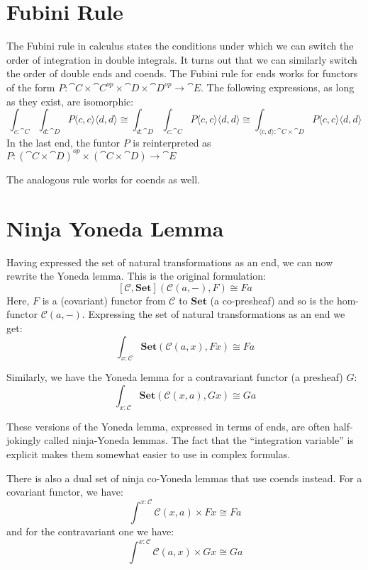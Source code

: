 \documentclass[DaoFP]{subfiles}
\begin{document}
\section{Fubini Rule}

The Fubini rule in calculus states the conditions under which we can switch the order of integration in double integrals. It turns out that we can similarly switch the order of double ends and coends. The Fubini rule for ends works for functors of the form $P \colon \cat C \times \cat C^{op} \times \cat D \times \cat D^{op} \to \cat E$. The following expressions, as long as they exist, are isomorphic:
\[ \int_{c \colon \cat C} \int_{d \colon \cat D} P\langle c, c \rangle \langle d, d \rangle \cong  \int_{d \colon \cat D} \int_{c \colon \cat C} P\langle c, c \rangle \langle d, d \rangle \cong  \int_{\langle c, d \rangle \colon \cat C \times \cat D}  P\langle c, c \rangle \langle d, d \rangle \]
In the last end, the funtor $P$ is reinterpreted as $P \colon (\cat C  \times \cat D)^{op} \times (\cat C \times \cat D)\to \cat E$

The analogous rule works for coends as well.

\section{Ninja Yoneda Lemma}

Having expressed the set of natural transformations as an end, we can now rewrite the Yoneda lemma. This is the original formulation:
\[ [\mathcal{C}, \mathbf{Set}]( \mathcal{C}(a, -), F) \cong F a \]
Here, $F$ is a (covariant) functor from $\mathcal{C}$ to $\mathbf{Set}$ (a co-presheaf) and so is the hom-functor $\mathcal{C}(a, -)$. 
Expressing the set of natural transformations as an end we get:
\[ \int_{x \colon \mathcal{C}} \mathbf{Set} (\mathcal{C}(a, x), F x) \cong F a \]

Similarly, we have the Yoneda lemma for a contravariant functor (a presheaf) $G$:
\[ \int_{x \colon \mathcal{C}} \mathbf{Set} (\mathcal{C}(x, a), G x) \cong G a \]

These versions of the Yoneda lemma, expressed in terms of ends, are often half-jokingly called ninja-Yoneda lemmas. The fact that the ``integration variable'' is explicit makes them somewhat easier to use in complex formulas.

There is also a dual set of ninja co-Yoneda lemmas that use coends instead. For a covariant functor, we have:
\[ \int^{x \colon \mathcal{C}} \mathcal{C}(x, a) \times F x \cong F a \]
and for the contravariant one we have:
\[ \int^{x \colon \mathcal{C}} \mathcal{C}(a, x) \times G x \cong G a \]
\end{document}
